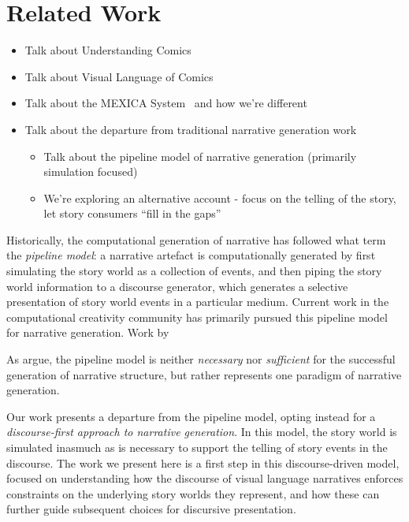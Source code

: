 \section{Related Work}





\begin{itemize}

	\item Talk about Understanding Comics~\cite{mcCloud1993understanding}
	\item Talk about Visual Language of Comics~\cite{cohn2013visual}
	\item Talk about the MEXICA System~\cite{perez2001mexica} and how we're different
	\item Talk about the departure from traditional narrative generation work
	\begin{itemize}
		\item Talk about the pipeline model of narrative generation (primarily 
		simulation focused)
		\item We're exploring an alternative account - 
		focus on the telling of the story, let story consumers ``fill in the gaps''
	\end{itemize}

\end{itemize}


Historically, the computational generation of narrative has followed what
 term the \emph{pipeline model}: a narrative
artefact is computationally generated by first simulating the story world
as a collection of events, and then piping the story world information to a
discourse generator, which generates a selective presentation of story
world events in a particular medium. Current work in the computational
creativity community has primarily pursued this pipeline model for
narrative generation. Work by 

As \citeauthor{ronfard2014story} argue, the pipeline model is neither
\emph{necessary} nor \emph{sufficient} for the successful generation of
narrative structure, but rather represents one paradigm of narrative
generation.  


Our work presents a departure from the pipeline model, opting instead for a
\emph{discourse-first approach to narrative generation}. In this model, the
story world is simulated inasmuch as is necessary to support the telling of
story events in the discourse. The work we present here is a first step in
this discourse-driven model, focused on understanding how the discourse of
visual language narratives enforces constraints on the underlying story
worlds they represent, and how these can further guide subsequent choices
for discursive presentation.

